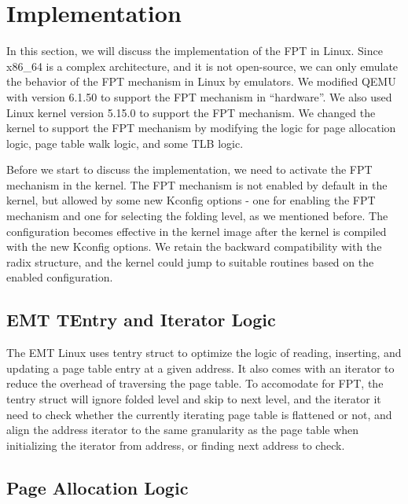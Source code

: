 \section{Implementation}


In this section, we will discuss the implementation of the FPT in Linux. Since x86\_64 is a complex architecture, and it is not open-source, we can only emulate the behavior of the FPT mechanism in Linux by emulators. We modified QEMU with version 6.1.50 to support the FPT mechanism in ``hardware''. We also used Linux kernel version 5.15.0 to support the FPT mechanism. We changed the kernel to support the FPT mechanism by modifying the logic for page allocation logic, page table walk logic, and some TLB logic.

Before we start to discuss the implementation, we need to activate the FPT mechanism in the kernel. The FPT mechanism is not enabled by default in the kernel, but allowed by some new Kconfig options - one for enabling the FPT mechanism and one for selecting the folding level, as we mentioned before. The configuration becomes effective in the kernel image after the kernel is compiled with the new Kconfig options. We retain the backward compatibility with the radix structure, and the kernel could jump to suitable routines based on the enabled configuration.

\subsection{EMT TEntry and Iterator Logic}

The EMT Linux uses tentry struct to optimize the logic of reading, inserting, and updating a page table entry at a given address. It also comes with an iterator to reduce the overhead of traversing the page table. To accomodate for FPT, the tentry struct will ignore folded level and skip to next level, and the iterator it need to check whether the currently iterating page table is flattened or not, and align the address iterator to the same granularity as the page table when initializing the iterator from address, or finding next address to check.

\subsection{Page Allocation Logic}

